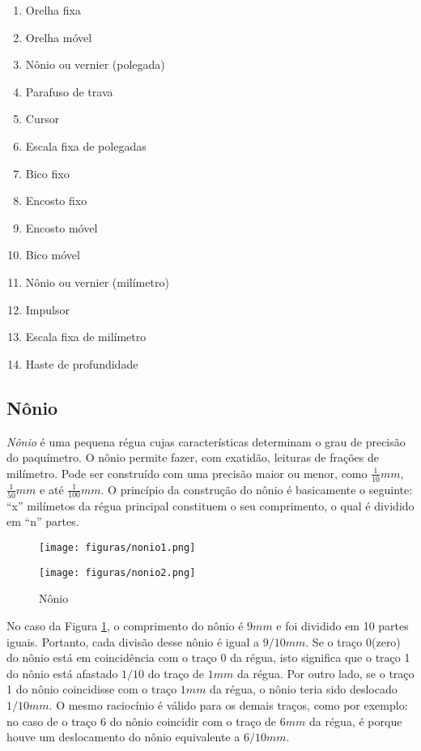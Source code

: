 \begin{multicols}{2}
\begin{enumerate}
\item Orelha fixa
\item Orelha móvel
\item Nônio ou vernier (polegada)
\item Parafuso de trava
\item Cursor
\item Escala fixa de polegadas
\item Bico fixo
\item Encosto fixo
\item Encosto móvel
\item Bico móvel
\item Nônio ou vernier (milímetro)
\item Impulsor
\item Escala fixa de milímetro
\item Haste de profundidade
\end{enumerate}
\end{multicols}

\subsection{Nônio}
\emph{Nônio} é uma pequena régua cujas características determinam o grau de precisão do paquímetro. O nônio permite fazer, com exatidão, leituras de frações de milímetro. Pode ser construído com uma precisão maior ou menor, como  $\frac{1}{10}mm$, $\frac{1}{50}mm$ e até  $\frac{1}{100}mm$. O princípio da construção do nônio é basicamente o seguinte: ``x'' milímetos da régua principal constituem o seu comprimento, o qual é dividido em ``n'' partes.


\begin{figure}[ht]
\label{fig:nonio}
\centering
\begin{minipage}{\linewidth}
\begin{minipage}{0.4\linewidth}
\texttt{[image: figuras/nonio1.png]} 
\end{minipage}
\begin{minipage}{0.4\linewidth}
\texttt{[image: figuras/nonio2.png]} 
\end{minipage}
\end{minipage}
\caption{Nônio}
\end{figure}

No caso da Figura \ref{fig:nonio}, o comprimento do nônio é $9mm$ e foi dividido em 10 partes iguais. Portanto, cada divisão desse nônio é igual a $9/10mm$. Se o traço 0(zero) do nônio está em coincidência com o traço 0 da régua, isto significa que o traço 1 do nônio está afastado $1/10$ do traço de $1mm$ da régua. Por outro lado, se o traço 1 do nônio coincidisse com o traço $1mm$ da régua, o nônio teria sido deslocado $1/10mm$. O mesmo raciocínio é válido para os demais traços, como por exemplo: no caso de o traço 6 do nônio coincidir com o traço de $6mm$ da régua, é porque houve um deslocamento do nônio equivalente a $6/10mm$.

